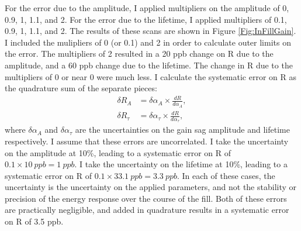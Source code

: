 		For the error due to the amplitude, I applied multipliers on the amplitude of 0, 0.9, 1, 1.1, and 2. For the error due to the lifetime, I applied multipliers of 0.1, 0.9, 1, 1.1, and 2. The results of these scans are shown in Figure \ref{Fig:InFillGain}. I included the mulipliers of 0 (or 0.1) and 2 in order to calculate outer limits on the error. The multipliers of 2 resulted in a 20 ppb change on R due to the amplitude, and a 60 ppb change due to the lifetime. The change in R due to the multipliers of 0 or near 0 were much less. I calculate the systematic error on R as the quadrature sum of the separate pieces: 
		\begin{align}
			\delta R_{A} &= \delta\alpha_{A} \times \frac{dR}{d\alpha_{A}}, \\
			\delta R_{\tau} &= \delta\alpha_{\tau} \times \frac{dR}{d\alpha_{\tau}},
		\end{align}
		where $\delta\alpha_{A}$ and $\delta\alpha_{\tau}$ are the uncertainties on the gain sag amplitude and lifetime respectively. I assume that these errors are uncorrelated. I take the uncertainty on the amplitude at 10\%, leading to a systematic error on R of $0.1 \times \SI{10}{ppb} = \SI{1}{ppb}$. I take the uncertainty on the lifetime at 10\%, leading to a systematic error on R of $0.1 \times \SI{33.1}{ppb} = \SI{3.3}{ppb}$. In each of these cases, the uncertainty is the uncertainty on the applied parameters, and not the stability or precision of the energy response over the course of the fill. Both of these errors are practically negligible, and added in quadrature results in a systematic error on R of 3.5 ppb.

